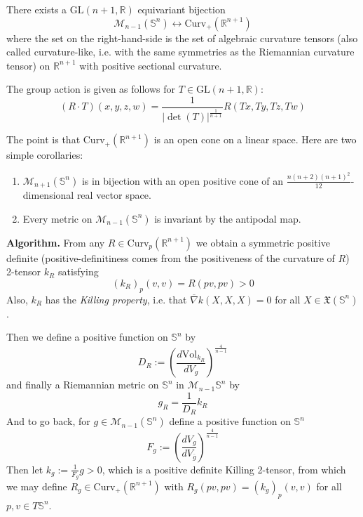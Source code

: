\begin{theorem}
\label{theorem-equivariant-bijection}
There exists a $\text{GL}(n+1,\mathbb{R})$
equivariant bijection
$$
\mathcal{M}_{n-1}(\mathbb{S}^n)
\leftrightarrow
\text{Curv}_+(\mathbb{R}^{n+1})
$$
where the set on the right-hand-side is the
set of algebraic curvature tensors
(also called curvature-like, i.e. with the
same symmetries as the Riemannian
curvature tensor) on $\mathbb{R}^{n+1}$ with
positive sectional curvature.

The group action is given as follows for
$T\in\text{GL}(n+1,\mathbb{R})$:
$$
(R\cdot
T)(x,y,z,w)=\frac{1}{|\det(T)|^{\frac{1}{n+1}
}}R(Tx,Ty,Tz,Tw)
$$
\end{theorem}

The point is that
$\text{Curv}_+(\mathbb{R}^{n+1})$ is an open
cone on a linear
space. Here are two simple corollaries:

\begin{lemma}
\label{lemma-corollaries}
\begin{enumerate}
\item $\mathcal{M}_{n+1}(\mathbb{S}^n)$ is in
bijection with an open positive
cone of an
$\frac{n(n+2)(n+1)^2}{12}$-dimensional real
vector space.
\item Every metric on
$\mathcal{M}_{n-1}(\mathbb{S}^n)$ is
invariant by the
antipodal map.
\end{enumerate}
\end{lemma}

{\bf Algorithm.} From any $R\in
\text{Curv}_p(\mathbb{R}^{n+1})$ we obtain a
symmetric positive definite
(positive-definitiness comes from the
positiveness
of the curvature of $R$) 2-tensor  $k_R$
satisfying
$$
(k_R)_p(v,v)=R(pv,pv)>0
$$
Also, $k_R$ has the  {\it Killing property},
i.e. that $\overline{\nabla}k(X,X,X)=0$ for
all
$X\in\mathfrak{X}(\mathbb{S}^n)$.

Then we define a positive function on
 $\mathbb{S}^n$ by
\begin{equation}
\label{equation-def-DR}
D_R:=\left(\frac{d\text{Vol}_{k_R}}{dV_g}
\right)^{\frac{4}{n-1}}
\end{equation}
and finally a Riemannian metric on
$\mathbb{S}^n$ in
$\mathcal{M}_{n-1}\mathbb{S}^n$ by
$$
g_R=\frac{1}{D_R}k_R
$$
And to go back, for $g \in
\mathcal{M}_{n-1}(\mathbb{S}^n)$ define a
positive
function on $\mathbb{S}^n$
$$
F_g:=\left(\frac{dV_g}{dV_{\overline{g}}}
\right)^{\frac{4}{n-1}}
$$
Then let $k_g:=\frac{1}{F_g}g>0$, which is a
positive definite Killing 2-tensor,
from which we may define
$R_g\in\text{Curv}_+(\mathbb{R}^{n+1})$ with
$R_g(pv,pv)=(k_g)_p(v,v)$ for all $p,v\in
T\mathbb{S}^n$.

